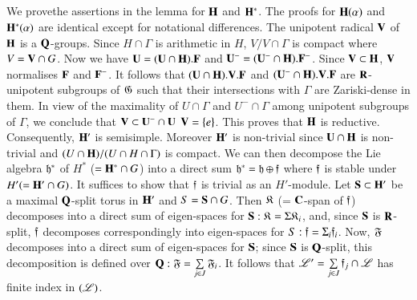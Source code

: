 \subsection{}\label{art9-subsec4.32}
We prove\pageoriginale the assertions in the lemma for $\mathbf{H}$ and $\mathbf{H}^\ast$. The proofs for $\mathbf{H}(\alpha)$ and $\mathbf{H}^\ast(\alpha)$ are identical except for notational differences. The unipotent radical $\mathbf{V}$ of $\mathbf{H}$ is a $\mathbf{Q}$-groups. Since $H \cap\Gamma$ is arithmetic in $H$, $V/V \cap\Gamma$ is compact where $V = \mathbf{V} \cap G$. Now we have $\mathbf{U} = (\mathbf{U} \cap \mathbf{H}). \mathbf{F}$ and $\mathbf{U}^- = (\mathbf{U}^- \cap \mathbf{H}). \mathbf{F}^-$. Since $\mathbf{V} \subset \mathbf{H}$, $\mathbf{V}$ normalises $\mathbf{F}$ and $\mathbf{F}^-$. It follows that $(\mathbf{U} \cap \mathbf{H}). \mathbf{V}. \mathbf{F}$ and $(\mathbf{U}^- \cap \mathbf{H}). \mathbf{V}.\mathbf{F}$ are $\mathbf{R}$-unipotent subgroups of $\mathfrak{G}$ such that their intersections with $\Gamma$ are Zariski-dense in them. In view of the maximality of $U \cap \Gamma$ and $U^- \cap  \Gamma$ among unipotent subgroups of $\Gamma$, we conclude that $\mathbf{V} \subset \mathbf{U}^- \cap \mathbf{U}$ \ie $\mathbf{V} = \{e\}$. This proves that $\mathbf{H}$ is reductive. Consequently, $\mathbf{H}'$ is semisimple. Moreover $\mathbf{H}'$ is non-trivial since $\mathbf{U} \cap \mathbf{H}$ is non-trivial and $(U \cap \mathbf{H})/ (U \cap H \cap \Gamma)$ is compact. We can then decompose the Lie algebra $\mathfrak{h}^\ast$ of $H^\ast$ ($=\mathbf{H}^\ast \cap G$) into a direct sum $\mathfrak{h}^\ast = \mathfrak{h} \oplus \mathfrak{f}$ where $\mathfrak{f}$ is stable under $H' (= \mathbf{H}' \cap G)$. It suffices to show that $\mathfrak{f}$ is trivial as an $H'$-module. Let $\mathbf{S}\subset \mathbf{H}'$ be a maximal $\mathbf{Q}$-split torus in $\mathbf{H}'$ and $S = \mathbf{S} \cap G$. Then $\mathfrak{K}$ (= $\mathbf{C}$-span of $\mathfrak{f}$) decomposes into a direct sum of eigen-spaces for $\mathbf{S}:\mathfrak{K} = \Sigma \mathfrak{K}_i$, and, since $\mathbf{S}$ is $\mathbf{R}$-split, $\mathfrak{f}$ decomposes correspondingly into eigen-spaces for $S: \mathfrak{f} = \Sigma_i \mathfrak{f}_i$. Now, $\mathfrak{F}$ decomposes into a direct sum of eigen-spaces for $\mathbf{S}$; since $\mathbf{S}$ is $\mathbf{Q}$-split, this decomposition is defined over $\mathbf{Q} : \mathfrak{F} = \sum\limits_{j \in J} \mathfrak{F}_i$. It follows that $\mathscr{L}'=\sum\limits_{j \in J} \mathfrak{f}_j \cap \mathscr{L}$ has finite index in $(\mathscr{L})$.

